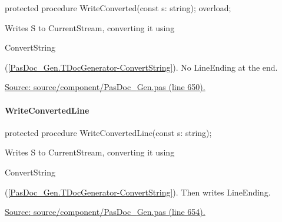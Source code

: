 \documentclass{report}
\newif\ifpdf
\begin{document}
\label{PasDoc_Gen.TDocGenerator-WriteConverted}
\begin{list}{}{
\setlength{\itemindent}{0cm}
\setlength{\listparindent}{0cm}
\setlength{\leftmargin}{\evensidemargin}
\addtolength{\leftmargin}{\tmplength}
\settowidth{\labelsep}{X}
\addtolength{\leftmargin}{\labelsep}
\setlength{\labelwidth}{\tmplength}
}
\item[\textbf{Declaration}\hfill]
\ifpdf
\begin{flushleft}
\fi
\begin{ttfamily}
protected procedure WriteConverted(const s: string); overload;\end{ttfamily}

\ifpdf
\end{flushleft}
\fi

\par
\item[\textbf{Description}]
Writes S to CurrentStream, converting it using \begin{ttfamily}ConvertString\end{ttfamily}(\ref{PasDoc_Gen.TDocGenerator-ConvertString}). No LineEnding at the end.\par
\href{https://github.com/pasdoc/pasdoc/blob/master/source/component/PasDoc_Gen.pas#L650}{Source: source/component/PasDoc{\_}Gen.pas (line 650).}

\end{list}
\paragraph*{WriteConvertedLine}\hspace*{\fill}

\label{PasDoc_Gen.TDocGenerator-WriteConvertedLine}
\begin{list}{}{
\setlength{\itemindent}{0cm}
\setlength{\listparindent}{0cm}
\setlength{\leftmargin}{\evensidemargin}
\addtolength{\leftmargin}{\tmplength}
\settowidth{\labelsep}{X}
\addtolength{\leftmargin}{\labelsep}
\setlength{\labelwidth}{\tmplength}
}
\item[\textbf{Declaration}\hfill]
\ifpdf
\begin{flushleft}
\fi
\begin{ttfamily}
protected procedure WriteConvertedLine(const s: string);\end{ttfamily}

\ifpdf
\end{flushleft}
\fi

\par
\item[\textbf{Description}]
Writes S to CurrentStream, converting it using \begin{ttfamily}ConvertString\end{ttfamily}(\ref{PasDoc_Gen.TDocGenerator-ConvertString}). Then writes LineEnding.\par
\href{https://github.com/pasdoc/pasdoc/blob/master/source/component/PasDoc_Gen.pas#L654}{Source: source/component/PasDoc{\_}Gen.pas (line 654).}

\end{list}
\end{document}
